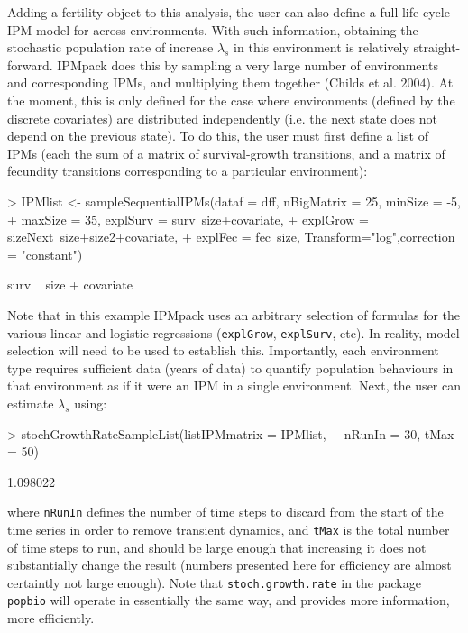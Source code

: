 \documentclass{article}
\begin{document}
Adding a fertility object to this analysis, the user can also define a full life
cycle IPM model for across environments. With such information, obtaining the stochastic population rate of increase $\lambda_s$ in this environment is relatively straight-forward. IPMpack does this by sampling a very large number of environments and corresponding IPMs, and multiplying them together (Childs et al. $2004$). At the moment, this is only defined for the case where environments (defined by the discrete covariates) are distributed independently (i.e. the next state does not depend on the previous state). To do this, the user must first define a list of IPMs (each the sum of a matrix of survival-growth transitions, and a matrix of fecundity transitions corresponding to a particular environment):
\begin{Schunk}
\begin{Sinput}
> IPMlist <- sampleSequentialIPMs(dataf = dff, nBigMatrix = 25, minSize = -5, 
+                         maxSize = 35, explSurv = surv~size+covariate, 
+                         explGrow = sizeNext~size+size2+covariate, 
+                         explFec = fec~size, Transform="log",correction = "constant")
\end{Sinput}
\begin{Soutput}
surv ~ size + covariate
\end{Soutput}
\end{Schunk}
Note that in this example IPMpack uses an arbitrary selection of
formulas for the various linear and logistic
regressions ({\tt explGrow}, {\tt explSurv}, etc). In reality,
model selection will need to be used to establish this. Importantly, each
environment type requires sufficient data (years of data) to quantify population
behaviours in that environment as if it were an IPM in a single environment.  
Next, the user can estimate $\lambda_s$ using:
\begin{Schunk}
\begin{Sinput}
> stochGrowthRateSampleList(listIPMmatrix = IPMlist, 
+                           nRunIn = 30, tMax = 50)
\end{Sinput}
\begin{Soutput}
[1] 1.098022
\end{Soutput}
\end{Schunk}
where {\tt nRunIn} defines the number of time steps to discard from the start of the time series in order to remove transient dynamics, and {\tt tMax} is the total
number of time steps to run, and should be large enough that increasing it does not substantially change the result (numbers presented here for efficiency are almost certaintly not large enough). Note that {\tt stoch.growth.rate} in the package {\tt popbio} will operate in essentially the same way, and provides more information, more efficiently.  
\end{document}
